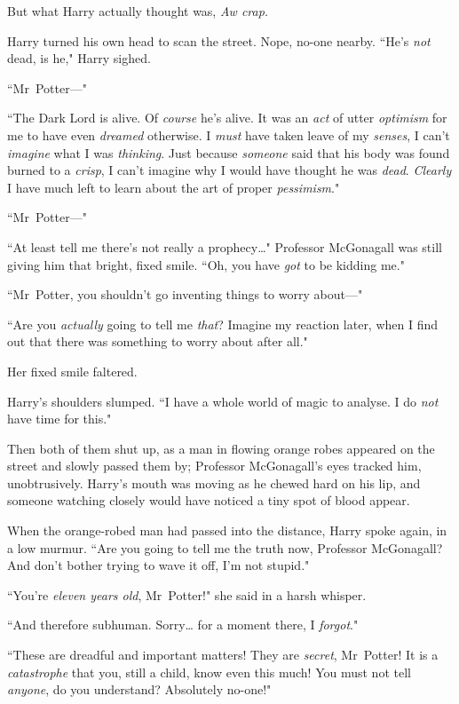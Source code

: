 But what Harry actually thought was, \emph{Aw crap.}

Harry turned his own head to scan the street. Nope, no-one nearby. ``He's \emph{not} dead, is he," Harry sighed.

``Mr~Potter—"

``The Dark Lord is alive. Of \emph{course} he's alive. It was an \emph{act} of utter \emph{optimism} for me to have even \emph{dreamed} otherwise. I \emph{must} have taken leave of my \emph{senses}, I can't \emph{imagine} what I was \emph{thinking}. Just because \emph{someone} said that his body was found burned to a \emph{crisp}, I can't imagine why I would have thought he was \emph{dead}. \emph{Clearly} I have much left to learn about the art of proper \emph{pessimism}."

``Mr~Potter—"

``At least tell me there's not really a prophecy{\ldots}" Professor McGonagall was still giving him that bright, fixed smile. ``Oh, you have \emph{got} to be kidding me."

``Mr~Potter, you shouldn't go inventing things to worry about—"

``Are you \emph{actually} going to tell me \emph{that}? Imagine my reaction later, when I find out that there was something to worry about after all."

Her fixed smile faltered.

Harry's shoulders slumped. ``I have a whole world of magic to analyse. I do \emph{not} have time for this."

Then both of them shut up, as a man in flowing orange robes appeared on the street and slowly passed them by; Professor McGonagall's eyes tracked him, unobtrusively. Harry's mouth was moving as he chewed hard on his lip, and someone watching closely would have noticed a tiny spot of blood appear.

When the orange-robed man had passed into the distance, Harry spoke again, in a low murmur. ``Are you going to tell me the truth now, Professor McGonagall? And don't bother trying to wave it off, I'm not stupid."

``You're \emph{eleven years old}, Mr~Potter!" she said in a harsh whisper.

``And therefore subhuman. Sorry{\ldots} for a moment there, I \emph{forgot}."

``These are dreadful and important matters! They are \emph{secret}, Mr~Potter! It is a \emph{catastrophe} that you, still a child, know even this much! You must not tell \emph{anyone}, do you understand? Absolutely no-one!"

